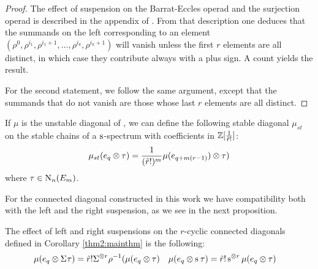 \begin{proof}
 The effect of suspension on the Barrat-Eccles operad and the surjection operad is described in the appendix of \cite{berger2004combinatorial}. From that description one deduces that the summands on the left corresponding to an element $(\rho^0,\rho^{i_1},\rho^{i_1+1},\dots,\rho^{i_k},\rho^{i_k+1})$ will vanish unless the first $r$ elements are all distinct, in which case they contribute always with a plus sign. A count yields the result.

 For the second statement, we follow the same argument, except that the summands that do not vanish are those whose last $r$ elements are all distinct.
\end{proof}

\begin{corollary}
 If $\mu$ is the unstable diagonal of \cite{medina2021may_st}, we can define the following stable diagonal $\mu_{st}$ on the stable chains of a $\sus{}$-spectrum with coefficients in $\bZ[\frac{1}{\tilde{r}!}]$:
 \[
 \mu_{st}(e_q \ot \tau) = \frac{1}{(\tilde{r}!)^{m}}\mu(e_{q+m(r-1)}) \ot \tau)
 \]
 where $\tau\in \chains[n](E_m)$.
\end{corollary}

For the connected diagonal constructed in this work we have compatibility both with the left and the right suspension, as we see in the next proposition.

\begin{proposition}\label{prop:suspensionconnected}
 The effect of left and right suspensions on the $r$-cyclic connected diagonals defined in Corollary \ref{thm2:mainthm} is the following:
 \begin{align*}
 \mu(e_q \ot \susp{}\tau) &= \tilde{r}!\susp{\ot r}\rho^{-1}(\mu(e_q \ot \tau) &
 \mu(e_q \ot \sus{}\tau) &= \tilde{r}!\sus{\ot r}\mu(e_q \ot \tau)
 \end{align*}
\end{proposition}

